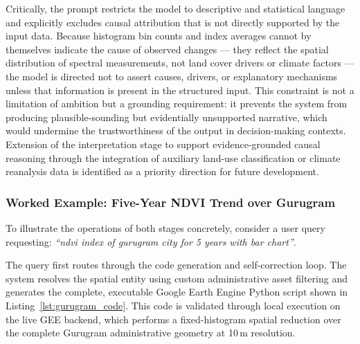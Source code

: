 \documentclass[pdflatex,sn-mathphys-ay]{sn-jnl}
\begin{document}
Critically, the prompt restricts the model to descriptive and statistical language and explicitly excludes causal attribution that is not directly supported by the input data. Because histogram bin counts and index averages cannot by themselves indicate the cause of observed changes --- they reflect the spatial distribution of spectral measurements, not land cover drivers or climate factors --- the model is directed not to assert causes, drivers, or explanatory mechanisms unless that information is present in the structured input. This constraint is not a limitation of ambition but a grounding requirement: it prevents the system from producing plausible-sounding but evidentially unsupported narrative, which would undermine the trustworthiness of the output in decision-making contexts. Extension of the interpretation stage to support evidence-grounded causal reasoning through the integration of auxiliary land-use classification or climate reanalysis data is identified as a priority direction for future development.

\subsubsection{Worked Example: Five-Year NDVI Trend over Gurugram}

To illustrate the operations of both stages concretely, consider a user query requesting: \textit{``ndvi index of gurugram city for 5 years with bar chart''}. 

The query first routes through the code generation and self-correction loop. The system resolves the spatial entity using custom administrative asset filtering and generates the complete, executable Google Earth Engine Python script shown in Listing~\ref{lst:gurugram_code}. This code is validated through local execution on the live GEE backend, which performs a fixed-histogram spatial reduction over the complete Gurugram administrative geometry at 10\,m resolution.
\end{document}
